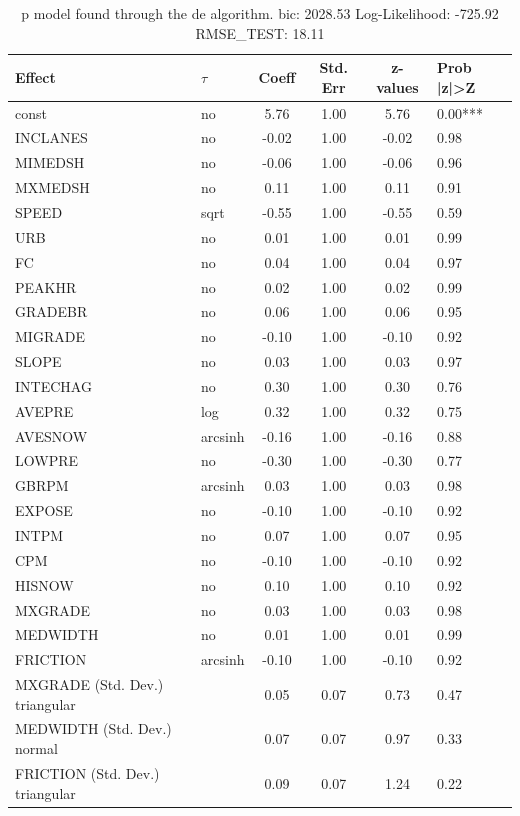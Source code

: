 \begin{table}
	\caption{p model found through the de algorithm. bic: 2028.53 Log-Likelihood: -725.92 RMSE_TEST: 18.11}
	\begin{center}
		\begin{tabular}{|l|l|c|c|c|l|}
			\hline
			Effect & $\tau$ & Coeff & Std. Err & z-values & Prob |z|>Z \\
			\hline
			const & no & 5.76 & 1.00 & 5.76 & 0.00*** \\
			\hline
			INCLANES & no & -0.02 & 1.00 & -0.02 & 0.98 \\
			\hline
			MIMEDSH & no & -0.06 & 1.00 & -0.06 & 0.96 \\
			\hline
			MXMEDSH & no & 0.11 & 1.00 & 0.11 & 0.91 \\
			\hline
			SPEED & sqrt & -0.55 & 1.00 & -0.55 & 0.59 \\
			\hline
			URB & no & 0.01 & 1.00 & 0.01 & 0.99 \\
			\hline
			FC & no & 0.04 & 1.00 & 0.04 & 0.97 \\
			\hline
			PEAKHR & no & 0.02 & 1.00 & 0.02 & 0.99 \\
			\hline
			GRADEBR & no & 0.06 & 1.00 & 0.06 & 0.95 \\
			\hline
			MIGRADE & no & -0.10 & 1.00 & -0.10 & 0.92 \\
			\hline
			SLOPE & no & 0.03 & 1.00 & 0.03 & 0.97 \\
			\hline
			INTECHAG & no & 0.30 & 1.00 & 0.30 & 0.76 \\
			\hline
			AVEPRE & log & 0.32 & 1.00 & 0.32 & 0.75 \\
			\hline
			AVESNOW & arcsinh & -0.16 & 1.00 & -0.16 & 0.88 \\
			\hline
			LOWPRE & no & -0.30 & 1.00 & -0.30 & 0.77 \\
			\hline
			GBRPM & arcsinh & 0.03 & 1.00 & 0.03 & 0.98 \\
			\hline
			EXPOSE & no & -0.10 & 1.00 & -0.10 & 0.92 \\
			\hline
			INTPM & no & 0.07 & 1.00 & 0.07 & 0.95 \\
			\hline
			CPM & no & -0.10 & 1.00 & -0.10 & 0.92 \\
			\hline
			HISNOW & no & 0.10 & 1.00 & 0.10 & 0.92 \\
			\hline
			MXGRADE & no & 0.03 & 1.00 & 0.03 & 0.98 \\
			\hline
			MEDWIDTH & no & 0.01 & 1.00 & 0.01 & 0.99 \\
			\hline
			FRICTION & arcsinh & -0.10 & 1.00 & -0.10 & 0.92 \\
			\hline
			MXGRADE (Std. Dev.) triangular &  & 0.05 & 0.07 & 0.73 & 0.47 \\
			\hline
			MEDWIDTH (Std. Dev.) normal &  & 0.07 & 0.07 & 0.97 & 0.33 \\
			\hline
			FRICTION (Std. Dev.) triangular &  & 0.09 & 0.07 & 1.24 & 0.22 \\
			\hline
		\end{tabular}
	\end{center}
\end{table}